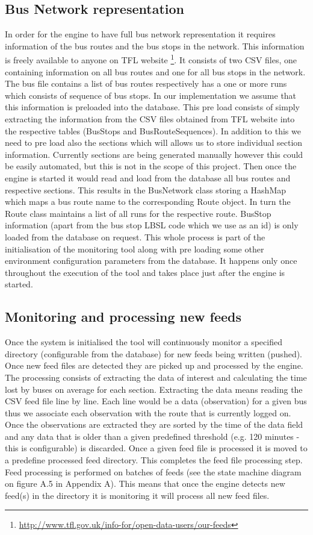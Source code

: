 \FloatBarrier
\subsection{Bus Network representation}
In order for the engine to have full bus network representation it requires information of the bus routes and the bus stops in the network. This information is freely available to anyone on TFL website \footnote{\url{http://www.tfl.gov.uk/info-for/open-data-users/our-feeds}}. It consists of two CSV files, one containing information on all bus routes and one for all bus stops in the network. The bus file contains a list of bus routes respectively has a one or more runs which consists of sequence of bus stops. In our implementation we assume that this information is preloaded into the database. This pre load consists of simply extracting the information from the CSV files obtained from TFL website into the respective tables (BusStops and BusRouteSequences). In addition to this we need to pre load also the sections which will allows us to store individual section information. Currently sections are being generated manually however this could be easily automated, but this is not in the scope of this project. Then once the engine is started it would read and load from the database all bus routes and respective sections. This results in the BusNetwork class storing a HashMap which maps a bus route name to the corresponding Route object. In turn the Route class maintains a list of all runs for the respective route. BusStop information (apart from the bus stop LBSL code which we use as an id) is only loaded from the database on request. This whole process is part of the initialisation of the monitoring tool along with pre loading some other environment configuration parameters from the database. It happens only once throughout the execution of the tool and takes place just after the engine is started.

\subsection{Monitoring and processing new feeds}
Once the system is initialised the tool will continuously monitor a specified directory (configurable from the database) for new feeds being written (pushed). Once new feed files are detected they are picked up and processed by the engine. The processing consists of extracting the data of interest and calculating the time lost by buses on average for each section. Extracting the data means reading the CSV feed file line by line. Each line would be a data (observation) for a given bus thus we associate each observation with the route that is currently logged on. Once the observations are extracted they are sorted by the time of the data field and any data that is older than a given predefined threshold (e.g. 120 minutes - this is configurable) is discarded. Once a given feed file is processed it is moved to a predefine processed feed directory. This completes the feed file processing step. Feed processing is performed on batches of feeds (see the state machine diagram on figure A.5 in Appendix A). This means that once the engine detects new feed(s) in the directory it is monitoring it will process all new feed files. 

